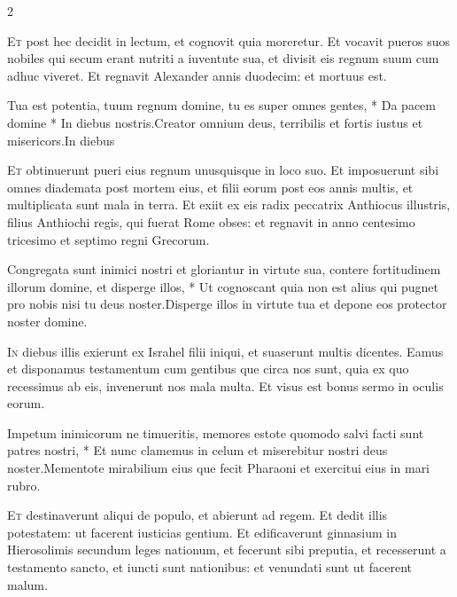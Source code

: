 \begin{multicols*}{2}
\begin{responsory}
\end{responsory}%
\lettrine[lines=2]{\zallmancaps \color{Blue} E}{t} post hec decidit in lectum, et cognovit quia moreretur. Et vocavit pueros suos nobiles qui secum erant nutriti a iuventute sua, et divisit eis regnum suum cum adhuc viveret. Et regnavit Alexander annis duodecim: et mortuus est.
\begin{responsory-final}
{Tua est potentia, tuum regnum domine, tu es super omnes gentes, * Da pacem domine * In diebus nostris.}{Creator omnium deus, terribilis et fortis iustus et misericors.}{In diebus}
\end{responsory-final}%
\lettrine[lines=2]{\zallmancaps \color{Red} E}{t} obtinuerunt pueri eius regnum unusquisque in loco suo. Et imposuerunt sibi omnes diademata post mortem eius, et filii eorum post eos annis multis, et multiplicata sunt mala in terra. Et exiit ex eis radix peccatrix Anthiocus illustris, filius Anthiochi regis, qui fuerat Rome obses: et regnavit in anno centesimo tricesimo et septimo regni Grecorum.
\begin{responsory}
{Congregata sunt inimici nostri et gloriantur in virtute sua, contere fortitudinem illorum domine, et disperge illos, * Ut cognoscant quia non est alius qui pugnet pro nobis nisi tu deus noster.}{Disperge illos in virtute tua et depone eos protector noster domine.}
\end{responsory}%
\lettrine[lines=2]{\zallmancaps \color{Blue} I}{n} diebus illis exierunt ex Israhel filii iniqui, et suaserunt multis dicentes. Eamus et disponamus testamentum cum gentibus que circa nos sunt, quia ex quo recessimus ab eis, invenerunt nos mala multa. Et visus est bonus sermo in oculis eorum.
\begin{responsory}
{Impetum inimicorum ne timueritis, memores estote quomodo salvi facti sunt patres nostri, * Et nunc clamemus in celum et miserebitur nostri deus noster.}{Mementote mirabilium eius que fecit Pharaoni et exercitui eius in mari rubro.}
\end{responsory}%
\lettrine[lines=2]{\zallmancaps \color{Red} E}{t} destinaverunt aliqui de populo, et abierunt ad regem. Et dedit illis potestatem: ut facerent iusticias gentium. Et edificaverunt ginnasium in Hierosolimis secundum leges nationum, et fecerunt sibi preputia, et recesserunt a testamento sancto, et iuncti sunt nationibus: et venundati sunt ut facerent malum.

\end{multicols*}
